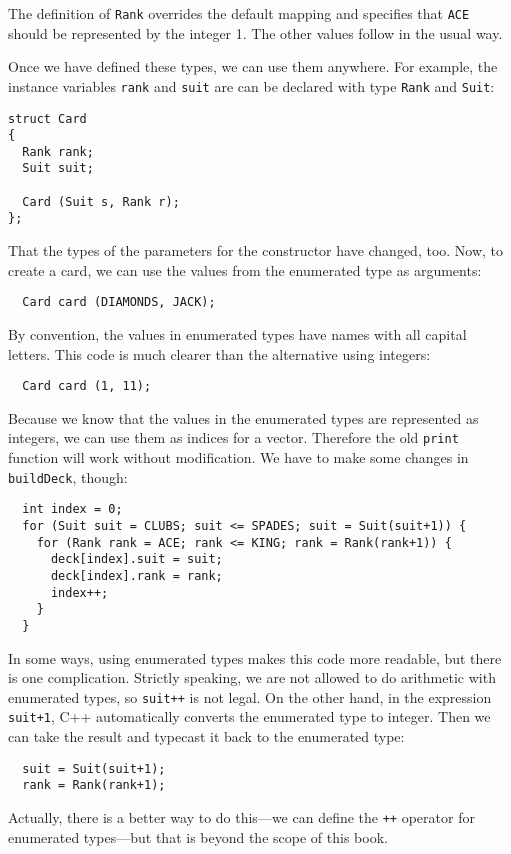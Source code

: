 The definition of {\tt Rank} overrides the default mapping and
specifies that {\tt ACE} should be represented by the integer 1.
The other values follow in the usual way.

Once we have defined these types, we can use them anywhere.  For
example, the instance variables {\tt rank} and {\tt suit} are
can be declared with type {\tt Rank} and {\tt Suit}:

\begin{verbatim}
struct Card
{
  Rank rank;
  Suit suit;

  Card (Suit s, Rank r);
};
\end{verbatim}
%
That the types of the parameters for the constructor
have changed, too.  Now, to create a card, we can use the values from
the enumerated type as arguments:

\begin{verbatim}
  Card card (DIAMONDS, JACK);
\end{verbatim}
%
By convention, the values in enumerated types have names with
all capital letters. 
This code is much clearer than the alternative using integers:

\begin{verbatim}
  Card card (1, 11);
\end{verbatim}
%
Because we know that the values in the enumerated types are
represented as integers, we can use them as indices for a vector.
Therefore the old {\tt print} function will work without
modification.  We have to make some changes in {\tt buildDeck},
though:

\begin{verbatim}
  int index = 0;
  for (Suit suit = CLUBS; suit <= SPADES; suit = Suit(suit+1)) {
    for (Rank rank = ACE; rank <= KING; rank = Rank(rank+1)) {
      deck[index].suit = suit;
      deck[index].rank = rank;
      index++;
    }
  }
\end{verbatim}
%
In some ways, using enumerated types makes this code more readable,
but there is one complication.  Strictly speaking, we are not
allowed to do arithmetic with enumerated types, so {\tt suit++}
is not legal.  On the other hand, in the expression {\tt suit+1},
C++ automatically converts the enumerated type to integer.  Then
we can take the result and typecast it back to the enumerated type:

\begin{verbatim}
  suit = Suit(suit+1);
  rank = Rank(rank+1);
\end{verbatim}
%
Actually, there is a better way to do this---we can define
the {\tt ++} operator for enumerated types---but that is beyond
the scope of this book.

